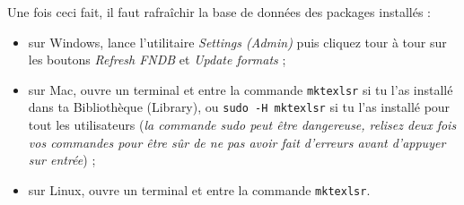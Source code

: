 \documentclass[a4paper,12pt,twoside]{article}
\begin{document}
Une fois ceci fait, il faut rafraîchir la base de données des packages installés :
\begin{itemize}
	\item sur Windows, lance l'utilitaire \emph{Settings (Admin)} puis cliquez tour à tour sur les boutons \emph{Refresh FNDB} et \emph{Update formats} ;
	\item sur Mac, ouvre un terminal et entre la commande \verb|mktexlsr| si tu l'as installé dans ta Bibliothèque (Library), ou \verb|sudo -H mktexlsr| si tu l'as installé pour tout les utilisateurs (\emph{la commande sudo peut être dangereuse, relisez deux fois vos commandes pour être sûr de ne pas avoir fait d'erreurs avant d'appuyer sur entrée}) ;
	\item sur Linux, ouvre un terminal et entre la commande \verb|mktexlsr|.
\end{itemize}
\end{document}
